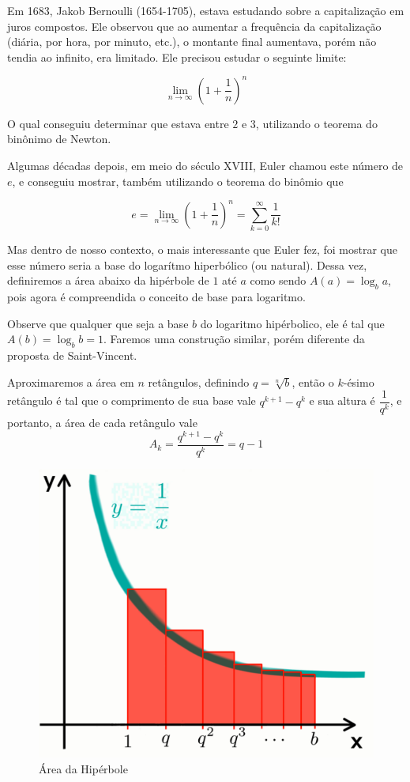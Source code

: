 Em 1683, Jakob Bernoulli (1654-1705), estava estudando sobre a capitalização em juros compostos. Ele observou que ao aumentar a frequência da capitalização (diária, por hora, por minuto, etc.), o montante final aumentava, porém não tendia ao infinito, era limitado. Ele precisou estudar o seguinte limite:

\[
\lim_{n \to \infty}\left(1+\frac{1}{n}\right)^n
\]

O qual conseguiu determinar que estava entre $2$ e $3$, utilizando o teorema do binônimo de Newton.

Algumas décadas depois, em meio do século XVIII, Euler chamou este número de $e$, e conseguiu mostrar, também utilizando o teorema do binômio que

\[
e = \lim_{n \to \infty}\left(1+\frac{1}{n}\right)^n = \sum_{k=0}^{\infty}\frac{1}{k!}
\]

Mas dentro de nosso contexto, o mais interessante que Euler fez, foi mostrar que esse número seria a base do logarítmo hiperbólico (ou natural). Dessa vez, definiremos a área abaixo da hipérbole de $1$ até $a$ como sendo $A(a) = \log_{b} a$, pois agora é compreendida o conceito de base para logaritmo.

Observe que qualquer que seja a base $b$ do logaritmo hipérbolico, ele é tal que $A(b) = \log_{b} b = 1$. Faremos uma construção similar, porém diferente da proposta de Saint-Vincent.

Aproximaremos a área em $n$ retângulos, definindo $q = \sqrt[n]{b}$, então o $k$-ésimo retângulo é tal que o comprimento de sua base vale $q^{k+1} - q^k$ e sua altura é $\dfrac{1}{q^k}$, e portanto, a área de cada retângulo vale
\[
    A_k = \frac{q^{k+1}-q^k}{q^k} = q - 1
\]

\begin{figure}[H]
    \centering
    \includegraphics[width=0.5\linewidth]{img/eulerNatural.png}
    \caption{Área da Hipérbole}
    \label{fig:hiperboleeuler}
\end{figure}

